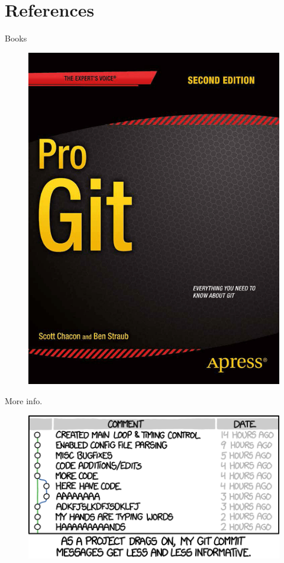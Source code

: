 \documentclass{beamer}
\begin{document}
\section{References}
\begin{frame}{Books}
    \begin{figure}
        \includegraphics[height=.6\textheight]{progit}
        \label{fig:book-progit}
    \end{figure}
\end{frame}

\begin{frame}{More info.}
\end{frame}

\begin{frame}
    \begin{figure}
        \includegraphics[height=.4\textheight]{git_commit}
        \label{fig:xkcd-git-commit}
    \end{figure}
\end{frame}
\end{document}
